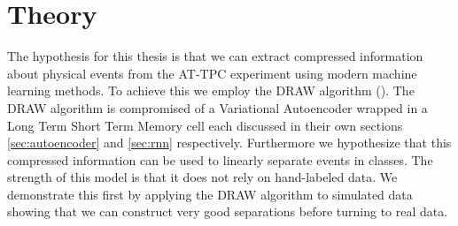 \chapter{Theory}

The hypothesis for this thesis is that we can extract compressed information about physical events from the AT-TPC experiment using modern machine learning methods. To achieve this we employ the DRAW algorithm (\cite{Gregor2015}). The DRAW algorithm is compromised of a Variational Autoencoder wrapped in a Long Term Short Term Memory cell each discussed in their own sections \ref{sec:autoencoder} and \ref{sec:rnn} respectively. Furthermore we hypothesize that this compressed information can be used to linearly separate events in classes. The strength of this model is that it does not rely on hand-labeled data. We demonstrate this first by applying the DRAW algorithm to simulated data showing that we can construct very good separations before turning to real data.